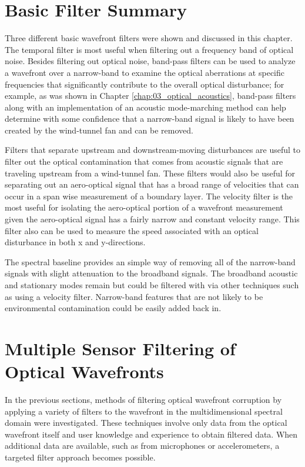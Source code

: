 \section{Basic Filter Summary}
Three different basic wavefront filters were shown and discussed in this chapter.
The temporal filter is most useful when filtering out a frequency band of optical noise.
Besides filtering out optical noise, band-pass filters can be used to analyze a wavefront over a narrow-band to examine the optical aberrations at specific frequencies that significantly contribute to the overall optical disturbance; for example, as was shown in Chapter \ref{chap:03_optical_acoustics}, band-pass filters along with an implementation of an acoustic mode-marching method can help determine with some confidence that a narrow-band signal is likely to have been created by the wind-tunnel fan and can be removed.

Filters that separate upstream and downstream-moving disturbances are useful to filter out the optical contamination that comes from acoustic signals that are traveling upstream from a wind-tunnel fan.
These filters would also be useful for separating out an aero-optical signal that has a broad range of velocities that can occur in a span wise measurement of a boundary layer.
The velocity filter is the most useful for isolating the aero-optical portion of a wavefront measurement given the aero-optical signal has a fairly narrow and constant velocity range.
This filter also can be used to measure the speed associated with an optical disturbance in both x and y-directions.

The spectral baseline provides an simple way of removing all of the narrow-band signals with slight attenuation to the broadband signals.
The broadband acoustic and stationary modes remain but could be filtered with via other techniques such as using a velocity filter.
Narrow-band features that are not likely to be environmental contamination could be easily added back in.

\section{Multiple Sensor Filtering of Optical Wavefronts}
In the previous sections, methods of filtering optical wavefront corruption by applying a variety of filters to the wavefront in the multidimensional spectral domain were investigated.
These techniques involve only data from the optical wavefront itself and user knowledge and experience to obtain filtered data.
When additional data are available, such as from microphones or accelerometers, a targeted filter approach becomes possible.

